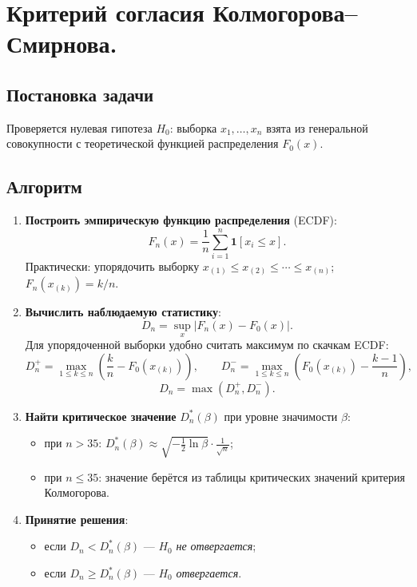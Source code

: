 \section{Критерий согласия Колмогорова–Смирнова.}

\subsection*{Постановка задачи}

Проверяется нулевая гипотеза $H_0$: выборка $x_1,\ldots,x_n$ взята из генеральной совокупности с теоретической функцией распределения $F_0(x)$.

\subsection*{Алгоритм}

\begin{enumerate}
  \item \textbf{Построить эмпирическую функцию распределения} (ECDF):
    \[
      F_n(x) = \frac{1}{n}\sum_{i=1}^n \mathbf{1}[x_i \le x].
    \]
    Практически: упорядочить выборку $x_{(1)} \le x_{(2)} \le \cdots \le x_{(n)}$; $F_n(x_{(k)}) = k/n$.

  \item \textbf{Вычислить наблюдаемую статистику}:
    \[
      D_n = \sup_{x}\bigl|F_n(x) - F_0(x)\bigr|.
    \]
    Для упорядоченной выборки удобно считать максимум по скачкам ECDF:
    \[
      D_n^+ = \max_{1\le k\le n}\left(\frac{k}{n}-F_0(x_{(k)})\right), \qquad
      D_n^- = \max_{1\le k\le n}\left(F_0(x_{(k)})-\frac{k-1}{n}\right),
    \]
    \[
      D_n = \max(D_n^+,D_n^-).
    \]

  \item \textbf{Найти критическое значение} $D_n^*(\beta)$ при уровне значимости $\beta$:
    \begin{itemize}
      \item при $n > 35$: \quad $D_n^*(\beta) \approx \sqrt{-\tfrac{1}{2}\ln\beta} \cdot \tfrac{1}{\sqrt{n}}$;
      \item при $n \le 35$: значение берётся из таблицы критических значений критерия Колмогорова.
    \end{itemize}

  \item \textbf{Принятие решения}:
    \begin{itemize}
      \item если $D_n < D_n^*(\beta)$ — $H_0$ \emph{не отвергается};
      \item если $D_n \ge D_n^*(\beta)$ — $H_0$ \emph{отвергается}.
    \end{itemize}
\end{enumerate}

